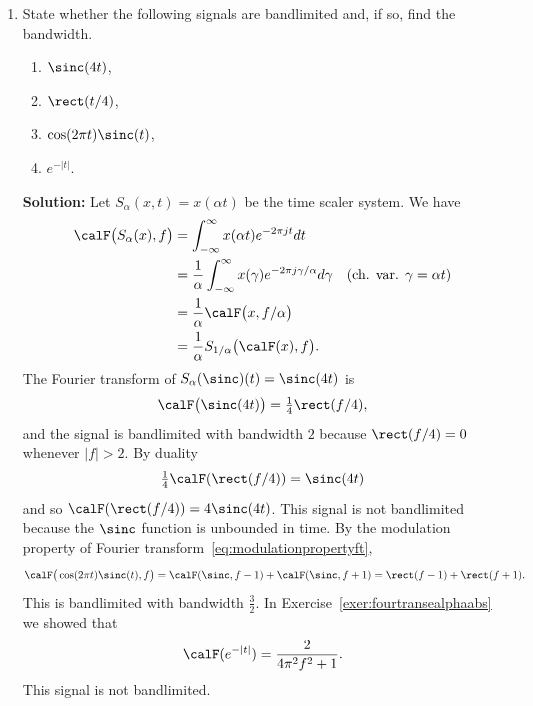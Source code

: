\documentclass[11pt,a4paper]{book}
\theoremstyle{plain}
\numberwithin{equation}{section}
\newcommand{\ints}{{\mathbb Z}}
\newcommand{\abs}[1]{\left\vert #1 \right\vert}
\newenvironment{solution}{\begin{footnotesize}\textbf{Solution:}}{\end{footnotesize}}
\newenvironment{excersizelist}{%
  \renewcommand*{\theenumi}{\thechapter.\arabic{enumi}}%
  \newcommand\itemadvanced{\stepcounter{enumi}\item[$\ast$\, \theenumi.]}
  \begin{enumerate}
}{%
  \end{enumerate}
}
\begin{document}
\begin{excersizelist}
\item State whether the following signals are bandlimited and, if so, find the bandwidth.
\begin{enumerate}
\item $\sinc(4t)$,
\item $\rect(t/4)$,
\item $\cos(2\pi t) \sinc(t)$,
\item $e^{-\abs{t}}$.
\end{enumerate}
\begin{solution}
Let $S_\alpha(x,t) = x(\alpha t)$ be the time scaler system.  We have 
\begin{align*}
\calF\big( S_\alpha(x), f\big) &= \int_{-\infty}^\infty x(\alpha t) e^{-2\pi j t } dt \\
&= \frac{1}{\alpha} \int_{-\infty}^\infty x(\gamma) e^{ -2\pi j \gamma / \alpha  } d\gamma & \text{(ch. var. $\gamma = \alpha t$)} \\
&= \frac{1}{\alpha} \calF\big( x, f/\alpha \big) \\
&= \frac{1}{\alpha} S_{1/\alpha}\big(\calF(x),f\big).
\end{align*}
The Fourier transform of $S_\alpha(\sinc)(t) = \sinc(4t)$ is
\[
\calF\big( \sinc(4t) \big) = \tfrac{1}{4} \rect(f/4),
\]
and the signal is bandlimited with bandwidth $2$ because $\rect(f/4) = 0$ whenever $\abs{f} > 2$.  By duality
\[
\tfrac{1}{4} \calF(\rect(f/4)) =  \sinc(4t)
\]
and so $\calF(\rect(f/4)) = 4 \sinc(4t)$.  This signal is not bandlimited because the $\sinc$ function is unbounded in time.  By the modulation property of Fourier transform~\eqref{eq:modulationpropertyft},
\[
\calF\big( \cos(2\pi t) \sinc(t), f \big) = \calF(\sinc,f-1) + \calF(\sinc,f+1) = \rect(f-1) + \rect(f+1). 
\]
This is bandlimited with bandwidth $\tfrac{3}{2}$.  In Exercise~\ref{exer:fourtransealphaabs} we showed that
\[
\calF(e^{-\abs{t}}) =  \frac{2}{4\pi^2 f^2 + 1}.
\]
This signal is not bandlimited.
\end{solution}





\end{excersizelist}
\end{document}
